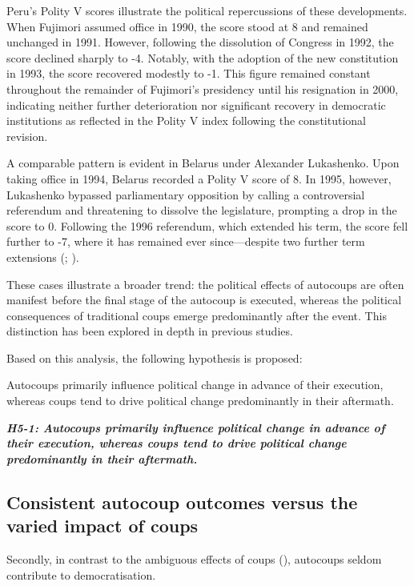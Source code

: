 \documentclass[
  12pt,
]{report}
\begin{document}
Peru's Polity V scores illustrate the political repercussions of these
developments. When Fujimori assumed office in 1990, the score stood at 8
and remained unchanged in 1991. However, following the dissolution of
Congress in 1992, the score declined sharply to -4. Notably, with the
adoption of the new constitution in 1993, the score recovered modestly
to -1. This figure remained constant throughout the remainder of
Fujimori's presidency until his resignation in 2000, indicating neither
further deterioration nor significant recovery in democratic
institutions as reflected in the Polity V index following the
constitutional revision.

A comparable pattern is evident in Belarus under Alexander Lukashenko.
Upon taking office in 1994, Belarus recorded a Polity V score of 8. In
1995, however, Lukashenko bypassed parliamentary opposition by calling a
controversial referendum and threatening to dissolve the legislature,
prompting a drop in the score to 0. Following the 1996 referendum, which
extended his term, the score fell further to -7, where it has remained
ever since---despite two further term extensions
(; ).

These cases illustrate a broader trend: the political effects of
autocoups are often manifest before the final stage of the autocoup is
executed, whereas the political consequences of traditional coups emerge
predominantly after the event. This distinction has been explored in
depth in previous studies.

Based on this analysis, the following hypothesis is proposed:

Autocoups primarily influence political change in advance of their
execution, whereas coups tend to drive political change predominantly in
their aftermath.

\textbf{\emph{H5-1: Autocoups primarily influence political change in
advance of their execution, whereas coups tend to drive political change
predominantly in their aftermath.}}

\subsection*{Consistent autocoup outcomes versus the varied impact of
coups}\label{consistent-autocoup-outcomes-versus-the-varied-impact-of-coups}

Secondly, in contrast to the ambiguous effects of coups
(), autocoups seldom
contribute to democratisation.
\end{document}
